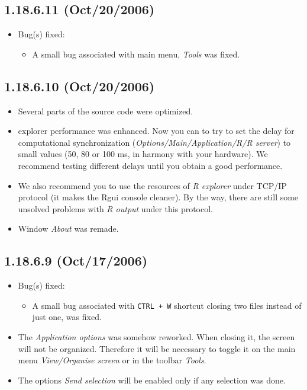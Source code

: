 \subsection{1.18.6.11 (Oct/20/2006)}

\begin{itemize}
  \item Bug(s) fixed:
    \begin{itemize}
      \item A small bug associated with main menu, \textit{Tools} was fixed.
    \end{itemize}
\end{itemize}


\subsection{1.18.6.10 (Oct/20/2006)}

\begin{itemize}
  \item Several parts of the source code were optimized.
  \item \RR{} explorer performance was enhanced. Now you can to try to set
    the delay for computational synchronization
    (\textit{Options/Main/Application/R/R server}) to small values
    (50, 80 or 100 ms, in harmony with your hardware). We recommend
    testing different delays until you obtain a good performance.
  \item We also recommend you to use the resources of \textit{R explorer}
    under TCP/IP protocol (it makes the Rgui console cleaner). By the way,
    there are still some unsolved problems with \textit{R output} under
    this protocol.
  \item Window \textit{About} was remade.
\end{itemize}


\subsection{1.18.6.9 (Oct/17/2006)}

\begin{itemize}
  \item Bug(s) fixed:
    \begin{itemize}
      \item A small bug associated with \texttt{CTRL + W} shortcut
        closing two files instead of just one, was fixed.
    \end{itemize}
  \item The \textit{Application options} was somehow reworked.
    When closing it, the screen will not be organized. Therefore it will
    be necessary to toggle it on the main menu \textit{View/Organise screen}
    or in the toolbar \textit{Tools}.
  \item The options \textit{Send selection} will be enabled only if any selection
    was done.
\end{itemize}


